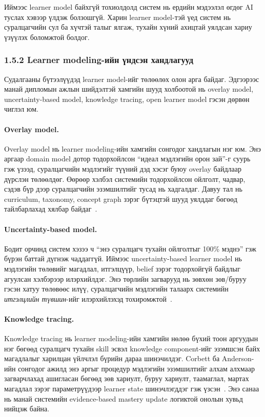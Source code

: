 \documentclass[12pt,A4]{report}
\begin{document}
Иймээс learner model байхгүй тохиолдолд систем нь ердийн мэдээлэл өгдөг AI туслах хэвээр үлдэж болзошгүй. Харин learner model-тэй үед систем нь суралцагчийн сул ба хүчтэй талыг ялгаж, тухайн хүний ахицтай уялдсан хариу үзүүлэх боломжтой болдог.

\subsubsection{1.5.2 Learner modeling-ийн үндсэн хандлагууд}

Судалгааны бүтээлүүдэд learner model-ийг төлөөлөх олон арга байдаг. Эдгээрээс манай дипломын ажлын шийдэлтэй хамгийн шууд холбоотой нь overlay model, uncertainty-based model, knowledge tracing, open learner model гэсэн дөрвөн чиглэл юм.

\paragraph{Overlay model.}
Overlay model нь learner modeling-ийн хамгийн сонгодог хандлагын нэг юм. Энэ аргаар domain model дотор тодорхойлсон ``идеал мэдлэгийн орон зай''-г суурь гэж үзээд, суралцагчийн мэдлэгийг түүний дэд хэсэг буюу overlay байдлаар дүрслэн төлөөлдөг. Өөрөөр хэлбэл системийн тодорхойлсон ойлголт, чадвар, сэдэв бүр дээр суралцагчийн эзэмшилтийг тусад нь хадгалдаг. Давуу тал нь curriculum, taxonomy, concept graph зэрэг бүтэцтэй шууд уялддаг бөгөөд тайлбарлахад хялбар байдаг~\cite{brusilovsky2007,desmarais2012}.

\paragraph{Uncertainty-based model.}
Бодит орчинд систем хэзээ ч ``энэ суралцагч тухайн ойлголтыг 100\% мэднэ'' гэж бүрэн баттай дүгнэж чаддаггүй. Иймээс uncertainty-based learner model нь мэдлэгийн төлөвийг магадлал, итгэлцүүр, belief зэрэг тодорхойгүй байдлыг агуулсан хэлбэрээр илэрхийлдэг. Энэ төрлийн загварууд нь зөвхөн зөв/буруу гэсэн хатуу төлөвөөс илүү, суралцагчийн мэдлэгийн талаарх системийн \emph{итгэлцлийн түвшин}-ийг илэрхийлэхэд тохиромжтой~\cite{brusilovsky2007,desmarais2012}.

\paragraph{Knowledge tracing.}
Knowledge tracing нь learner modeling-ийн хамгийн нөлөө бүхий тоон аргуудын нэг бөгөөд суралцагч тухайн skill эсвэл knowledge component-ийг эзэмшсэн байх магадлалыг харилцан үйлчлэл бүрийн дараа шинэчилдэг. Corbett ба Anderson-ийн сонгодог ажилд энэ аргыг процедур мэдлэгийн эзэмшилтийг алхам алхмаар загварчлахад ашигласан бөгөөд зөв хариулт, буруу хариулт, таамаглал, мартах магадлал зэрэг параметрүүдээр learner state шинэчлэгддэг гэж үзсэн~\cite{corbett1994}. Энэ санаа нь манай системийн evidence-based mastery update логиктой онолын хувьд нийцэж байна.
\end{document}
